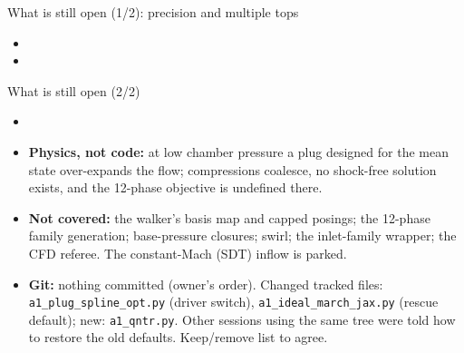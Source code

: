 \documentclass[aspectratio=169,10pt]{beamer}
\begin{document}
\begin{frame}{What is still open (1/2): precision and multiple tops}
\small
\begin{itemize}
\item \OPENONE
\item \OPENTWO
\end{itemize}
\end{frame}

\begin{frame}{What is still open (2/2)}
\small
\begin{itemize}
\item \OPENTHREE
\item \textbf{Physics, not code:} at low chamber pressure a plug designed for the mean state over-expands the flow;
compressions coalesce, no shock-free solution exists, and the 12-phase objective is undefined there.
\item \textbf{Not covered:} the walker's basis map and capped posings; the 12-phase family generation; base-pressure
closures; swirl; the inlet-family wrapper; the CFD referee. The constant-Mach (SDT) inflow is parked.
\item \textbf{Git:} nothing committed (owner's order). Changed tracked files: \texttt{a1\_plug\_spline\_opt.py} (driver
switch), \texttt{a1\_ideal\_march\_jax.py} (rescue default); new: \texttt{a1\_qntr.py}. Other sessions using the same tree
were told how to restore the old defaults. Keep/remove list to agree.
\end{itemize}
\end{frame}
\end{document}
